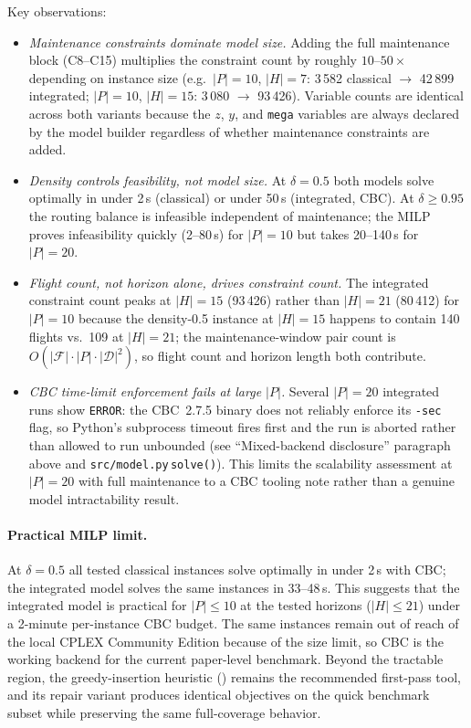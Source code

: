 Key observations:
\begin{itemize}
  \item \emph{Maintenance constraints dominate model size.}  Adding the
    full maintenance block (C8--C15) multiplies the constraint count by
    roughly $10$--$50\times$ depending on instance size (e.g.\ $|P|=10$,
    $|H|=7$: 3\,582 classical $\to$ 42\,899 integrated; $|P|=10$, $|H|=15$:
    3\,080 $\to$ 93\,426).  Variable counts are identical across both
    variants because the $z$, $y$, and \texttt{mega} variables are
    always declared by the model builder regardless of whether maintenance
    constraints are added.
  \item \emph{Density controls feasibility, not model size.}  At $\delta=0.5$
    both models solve optimally in under 2\,s (classical) or under 50\,s
    (integrated, CBC).  At $\delta \geq 0.95$ the routing balance is
    infeasible independent of maintenance; the MILP proves infeasibility
    quickly (2--80\,s) for $|P|=10$ but takes 20--140\,s for $|P|=20$.
  \item \emph{Flight count, not horizon alone, drives constraint count.}
    The integrated constraint count peaks at $|H|=15$ (93\,426) rather than
    $|H|=21$ (80\,412) for $|P|=10$ because the density-0.5 instance at
    $|H|=15$ happens to contain 140 flights vs.\ 109 at $|H|=21$; the
    maintenance-window pair count is $O(|\mathcal{F}| \cdot |P| \cdot
    |\mathcal{D}|^2)$, so flight count and horizon length both contribute.
  \item \emph{CBC time-limit enforcement fails at large $|P|$.}  Several
    $|P|=20$ integrated runs show \texttt{ERROR}: the CBC~2.7.5 binary does
    not reliably enforce its \texttt{-sec} flag, so Python's subprocess
    timeout fires first and the run is aborted rather than allowed to run
    unbounded (see ``Mixed-backend disclosure'' paragraph above and
    \texttt{src/model.py}\,\texttt{solve()}).  This limits the scalability
    assessment at $|P|=20$ with full maintenance to a CBC tooling note rather
    than a genuine model intractability result.
\end{itemize}

\paragraph{Practical MILP limit.}
At $\delta=0.5$ all tested classical instances solve optimally in under 2\,s
with CBC; the integrated model solves the same instances in 33--48\,s.  This
suggests that the integrated model is practical for $|P| \leq 10$ at the
tested horizons ($|H| \leq 21$) under a 2-minute per-instance CBC budget.
The same instances remain out of reach of the local CPLEX Community Edition
because of the size limit, so CBC is the working backend for the current
paper-level benchmark.  Beyond the tractable region, the greedy-insertion
heuristic () remains the recommended first-pass tool, and
its repair variant produces identical objectives on the quick benchmark subset
while preserving the same full-coverage behavior.

